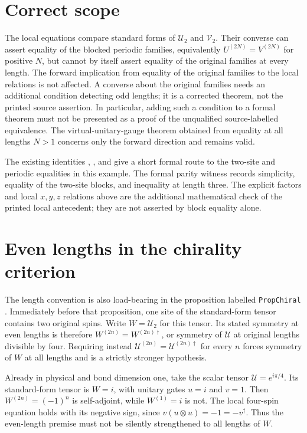 \documentclass{article}
\begin{document}
\section{Correct scope}

The local equations compare standard forms of $\mathcal U_2$ and
$\mathcal V_2$. Their converse can assert equality of the blocked periodic
families, equivalently $U^{(2N)}=V^{(2N)}$ for positive $N$, but cannot by
itself assert equality of the original families at every length. The forward
implication from equality of the original families to the local relations is
not affected. A converse about the original families needs an additional
condition detecting odd lengths; it is a corrected theorem, not the printed
source assertion. In particular, adding such a condition to a formal theorem
must not be presented as a proof of the unqualified source-labelled
equivalence. The virtual-unitary-gauge theorem obtained from equality at all
lengths $N>1$ concerns only the forward direction and remains valid.

The existing identities ,
, and  give a short
formal route to the two-site and periodic equalities in this example. The
formal parity witness records simplicity, equality of the two-site blocks,
and inequality at length three. The explicit factors and local $x,y,z$
relations above are the additional mathematical check of the printed local
antecedent; they are not asserted by block equality alone.

\section{Even lengths in the chirality criterion}

The length convention is also load-bearing in the proposition labelled
\texttt{PropChiral} \cite[lines~1209--1252]{Cirac2017MPU}. Immediately
before that proposition, one site of the standard-form tensor contains two
original spins. Write
$W=\mathcal U_2$ for this tensor. Its stated symmetry at even lengths is
therefore $W^{(2n)}=W^{(2n)\dagger}$, or symmetry of $\mathcal U$ at
original lengths divisible by four. Requiring instead
$\mathcal U^{(2n)}=\mathcal U^{(2n)\dagger}$ for every $n$ forces symmetry
of $W$ at all lengths and is a strictly stronger hypothesis.

Already in physical and bond dimension one, take the scalar tensor
$\mathcal U=e^{i\pi/4}$. Its standard-form tensor is $W=i$, with unitary
gates $u=i$ and $v=1$. Then $W^{(2n)}=(-1)^n$ is self-adjoint, while
$W^{(1)}=i$ is not. The local four-spin equation holds with its negative
sign, since $v(u\otimes u)=-1=-v^\dagger$. Thus the even-length premise
must not be silently strengthened to all lengths of $W$.
\end{document}
